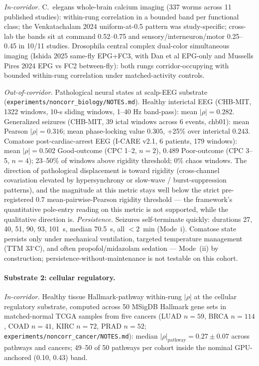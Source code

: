 \documentclass[11pt,a4paper]{article}
\begin{document}
\emph{In-corridor.} C.~elegans whole-brain calcium imaging (337 worms across 11 published studies): within-rung correlation in a bounded band per functional class; the Venkatachalam 2024 uniform-at-0.5 pattern was study-specific; cross-lab the bands sit at command 0.52--0.75 and sensory/interneuron/motor 0.25--0.45 in 10/11 studies. Drosophila central complex dual-color simultaneous imaging (Ishida 2025 same-fly EPG+FC3, with Dan et al EPG-only and Mussells Pires 2024 EPG vs FC2 between-fly): both rungs corridor-occupying with bounded within-rung correlation under matched-activity controls.

\emph{Out-of-corridor.} Pathological neural states at scalp-EEG substrate (\texttt{experiments/noncorr\_biology/NOTES.md}). Healthy interictal EEG (CHB-MIT, 1322 windows, 10-s sliding windows, 1--40 Hz band-pass): mean $|\rho| = 0.282$. Generalized seizures (CHB-MIT, 39 ictal windows across 6 events, chb01): mean Pearson $|\rho| = 0.316$; mean phase-locking value $0.305$, +25\% over interictal $0.243$. Comatose post-cardiac-arrest EEG (I-CARE v2.1, 6 patients, 179 windows): mean $|\rho| = 0.502$ Good-outcome (CPC 1--2, $n=2$), $0.489$ Poor-outcome (CPC 3--5, $n=4$); 23--50\% of windows above rigidity threshold; 0\% chaos windows. The direction of pathological displacement is toward rigidity (cross-channel covariation elevated by hypersynchrony or slow-wave / burst-suppression patterns), and the magnitude at this metric stays well below the strict pre-registered 0.7 mean-pairwise-Pearson rigidity threshold --- the framework's quantitative pole-entry reading on this metric is not supported, while the qualitative direction is. \emph{Persistence.} Seizures self-terminate quickly: durations 27, 40, 51, 90, 93, 101~s, median 70.5~s, all $<2$~min (Mode~i). Comatose state persists only under mechanical ventilation, targeted temperature management (TTM 33$^{\circ}$C), and often propofol/midazolam sedation --- Mode~(ii) by construction; persistence-without-maintenance is not testable on this cohort.

\paragraph{Substrate 2: cellular regulatory.}

\emph{In-corridor.} Healthy tissue Hallmark-pathway within-rung $|\rho|$ at the cellular regulatory substrate, computed across 50 MSigDB Hallmark gene sets in matched-normal TCGA samples from five cancers (LUAD $n=59$, BRCA $n=114$, COAD $n=41$, KIRC $n=72$, PRAD $n=52$; \texttt{experiments/noncorr\_cancer/NOTES.md}): median $|\rho|_{\text{pathway}} = 0.27 \pm 0.07$ across pathways and cancers; 49--50 of 50 pathways per cohort inside the nominal GPU-anchored (0.10, 0.43) band.
\end{document}
